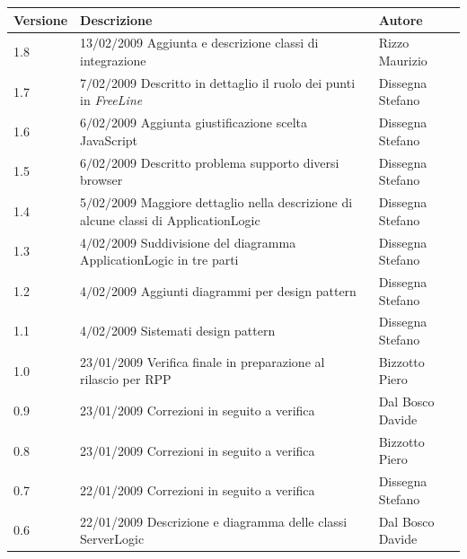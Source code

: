 \begin{center}
	\begin{table}[h]
		  \begin{tabular*}
			{1\textwidth}%
				{@{\extracolsep{\fill}}|p{}|p{}|p{}|}
			 \hline
			\textbf{Versione}  & \textbf{Descrizione} & \textbf{Autore} \\
		 \hline
                  1.8 & 13$\slash$02$\slash$2009 Aggiunta e descrizione classi di integrazione  & Rizzo Maurizio \\
                                \hline 
                  1.7 & 7$\slash$02$\slash$2009 Descritto in dettaglio il ruolo dei punti in \textit{FreeLine} & Dissegna Stefano \\
				\hline
                  1.6 & 6$\slash$02$\slash$2009 Aggiunta giustificazione scelta JavaScript & Dissegna Stefano \\
				\hline
                  1.5 & 6$\slash$02$\slash$2009 Descritto problema supporto diversi browser & Dissegna Stefano \\
				\hline
                  1.4 & 5$\slash$02$\slash$2009 Maggiore dettaglio nella descrizione di alcune classi di ApplicationLogic & Dissegna Stefano \\
				\hline
                  1.3 & 4$\slash$02$\slash$2009 Suddivisione del diagramma ApplicationLogic in tre parti & Dissegna Stefano \\
				\hline
                  1.2 & 4$\slash$02$\slash$2009 Aggiunti diagrammi per design pattern & Dissegna Stefano \\
				\hline
		  1.1 & 4$\slash$02$\slash$2009 Sistemati design pattern & Dissegna Stefano \\
				\hline
		  1.0 & 23$\slash$01$\slash$2009  Verifica finale in preparazione al rilascio per RPP & Bizzotto Piero \\		
		  		\hline
		  0.9 & 23/01/2009 Correzioni in seguito a verifica & Dal Bosco Davide \\
		  		\hline
		  0.8 & 23/01/2009 Correzioni in seguito a verifica & Bizzotto Piero \\
		  		\hline
		  0.7 & 22/01/2009 Correzioni in seguito a verifica & Dissegna Stefano \\
		  		\hline
		  0.6 & 22/01/2009 Descrizione e diagramma delle classi ServerLogic & Dal Bosco Davide\\

\end{tabular*}
\end{table}
\end{center}
